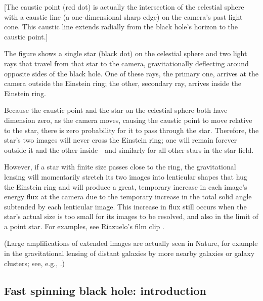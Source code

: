 \documentclass[12pt]{iopart}
\begin{document}
[The caustic point (red dot) is actually the intersection of the celestial 
sphere with a caustic line (a one-dimensional sharp edge) on the camera's past light cone.  This caustic line extends radially from the black hole's horizon
to the caustic point.]

The figure shows a single star (black dot) on the celestial sphere and two light rays
that travel from that star to the camera, gravitationally deflecting around
opposite sides of the black hole.  One of these rays, the primary one, arrives at the camera outside
the Einstein ring; the other, secondary ray, arrives inside the Einstein ring.  

Because the caustic point and the star on the celestial sphere both have dimension
zero,  as the camera moves, causing the caustic point to move relative to the star, there is zero probability
for it to pass through the star.  Therefore, the star's two images will never cross the Einstein
ring; one will remain forever outside it and the other inside---and similarly for all other
stars in the star field.  

However, if a star with finite size  passes close to the
ring, the gravitational lensing will momentarily stretch its two images  into lenticular shapes
that hug the Einstein ring and will produce a great, temporary increase in each image's energy flux at the camera
due to the temporary increase in the total solid angle subtended by each lenticular image.
This increase in flux still occurs when the star's actual size is too small for its images to
be resolved, and also in the limit of a point star.  For examples, see Riazuelo's film clip
\cite{Riazuelo14}.

(Large amplifications of extended images are actually seen in Nature, for example
in the gravitational lensing of distant galaxies by more nearby galaxies or galaxy
clusters; see, e.g., \cite{Bartelmann}.)

\subsection{Fast spinning black hole: introduction}
\label{subsec:KerrStarField}
\end{document}
